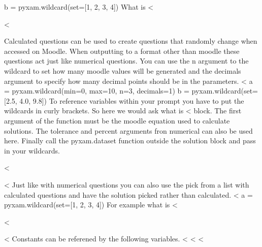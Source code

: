\documentclass[12pt]{exam}
\begin{document}
\begin{questions}
b = pyxam.wildcard(set=[1, 2, 3, 4])
                What is <%
                \begin{solution}
                    <%
                \end{solution}
                Calculated questions can be used to create questions that randomly change when accessed on Moodle. When
                outputting to a format other than moodle these questions act just like numerical questions. You can
                use the n argument to the wildcard to set how many moodle values will be generated and the decimals
                argument to specify how many decimal points should be in the parameters.
<%
a = pyxam.wildcard(min=0, max=10, n=3, decimals=1)
b = pyxam.wildcard(set=[2.5, 4.0, 9.8])
                To reference variables within your prompt you have to put the wildcards in curly brackets. So here we
                would ask what is <%
                block. The first argument of the function must be the moodle equation used to calculate solutions.
                The tolerance and percent arguments fron numerical can also be used here. Finally call the pyxam.dataset
                function outside the solution block and pass in your wildcards.
                \begin{solution}
                    <%
                \end{solution}
                <%
                Just like with numerical questions you can also use the pick from a list with calculated questions and
                have the solution picked rather than calculated.
<%
a = pyxam.wildcard(set=[1, 2, 3, 4])
                For example what is <%
                \begin{solution}
                    <%
                \end{solution}
                <%
                Constants can be referened by the following variables.
                <%
                <%
                <%

\end{questions}
\end{document}
